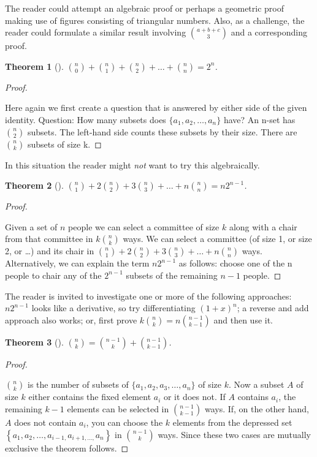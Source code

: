 \documentclass[10pt,]{book}
\theoremstyle{plain}
\newtheorem{theorem}{Theorem}[section]
\theoremstyle{definition}
\theoremstyle{definition}
\numberwithin{equation}{chapter}
\begin{document}
\hypertarget{p-285}{}%
The reader could attempt an algebraic proof or perhaps a geometric proof making use of figures consisting of triangular numbers. Also, as a challenge, the reader could formulate a similar result involving \(\binom{a + b + c}{3}\) and a corresponding proof.%
\begin{theorem}[{}]\label{theorem-8}
\hypertarget{p-286}{}%
\(\binom{n}{0} + \binom{n}{1} + \binom{n}{2} + \ldots + \binom{n}{n} = 2^{n}\).%
\end{theorem}
\begin{proof}\hypertarget{proof-6}{}
\hypertarget{p-287}{}%
Here again we first create a question that is answered by either side of the given identity. Question: How many subsets does \(\{ a_{1},a_{2},\ldots,a_{n}\}\) have? An n-set has \(\binom{n}{2}\) subsets. The left-hand side counts these subsets by their size. There are \(\binom{n}{k}\) subsets of size k.%
\end{proof}
\hypertarget{p-288}{}%
In this situation the reader might \emph{not} want to try this algebraically.%
\begin{theorem}[{}]\label{thm_anysizecommittee}
\hypertarget{p-289}{}%
\(\binom{n}{1} + 2 \binom{n}{2} + 3 \binom{n}{3} + \ldots + n \binom{n}{n} = {n2}^{n - 1}\).%
\end{theorem}
\begin{proof}\hypertarget{proof-7}{}
\hypertarget{p-290}{}%
Given a set of \(n\) people we can select a committee of size \(k\) along with a chair from that committee in \(k \binom{n}{k}\) ways. We can select a committee (of size 1, or size 2, or \ldots) and its chair in \(\binom{n}{1} + 2 \binom{n}{2} + 3 \binom{n}{3} + \ldots + n \binom{n}{n}\) ways. Alternatively, we can explain the term \(n2^{n - 1}\) as follows: choose one of the n people to chair any of the \(2^{n - 1}\) subsets of the remaining \(n - 1\) people.%
\end{proof}
\hypertarget{p-291}{}%
The reader is invited to investigate one or more of the following approaches: \(n2^{n - 1}\) looks like a derivative, so try differentiating \(\left( 1 + x \right)^{n}\); a reverse and add approach also works; or, first prove \(k \binom{n}{k} = n \binom{n - 1}{k - 1}\) and then use it.%
\begin{theorem}[{}]\label{theorem-10}
\hypertarget{p-292}{}%
\(\binom{n}{k} = \binom{n - 1}{k} + \binom{n - 1}{k - 1}\).%
\end{theorem}
\begin{proof}\hypertarget{proof-8}{}
\hypertarget{p-293}{}%
\(\binom{n}{k}\) is the number of subsets of \(\{ a_{1},a_{2},a_{3},\ldots,a_{n}\}\) of size \(k\). Now a subset \(A\) of size \(k\) either contains the fixed element \(a_{i}\) or it does not. If \(A\) contains \(a_{i}\), the remaining \(k - 1\) elements can be selected in \(\binom{n - 1}{k - 1}\) ways. If, on the other hand, \(A\) does not contain \(a_{i}\), you can choose the \(k\) elements from the depressed set \(\left\{ a_{1},a_{2},\ldots,a_{i - 1,}a_{i + 1,\ldots,}a_{n} \right\}\) in \(\binom{n - 1}{k}\) ways. Since these two cases are mutually exclusive the theorem follows.%
\end{proof}
\end{document}
